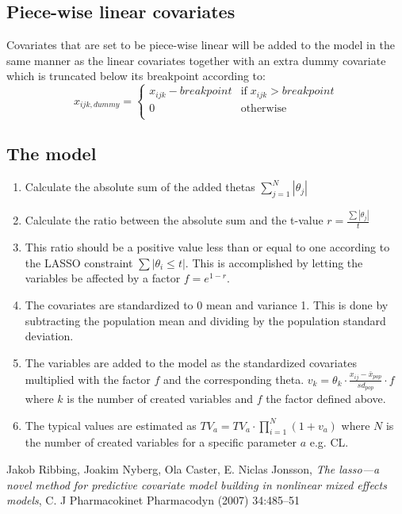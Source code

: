  
\subsection{Piece-wise linear covariates}
Covariates that are set to be piece-wise linear will be added to the model in the same manner as the linear covariates together with an extra dummy covariate which is truncated below its breakpoint according to:
\[   x_{ijk,dummy} = \left\{
        \begin{array}{ll}
            x_{ijk} - breakpoint & \textrm{if} \;  x_{ijk} > breakpoint \\
            0 & \textrm{otherwise} \\
        \end{array} 
    \right. \]

\subsection{The model}
\begin{enumerate}
    \item Calculate the absolute sum of the added thetas $\sum_{j=1}^N |\theta_j|$ 
    \item Calculate the ratio between the absolute sum and the t-value $r = \frac{\sum{|\theta_j|}}{t}$
    \item This ratio should be a positive value less than or equal to one according to the LASSO constraint $\sum{|\theta_i \le t|}$. This is accomplished by letting the variables be affected by a factor $f=e^{1-r}$.
    \item The covariates are standardized to 0 mean and variance 1. This is done by subtracting the population mean and dividing by the population standard deviation.
    \item The variables are added to the model as the standardized covariates multiplied with the factor $f$ and the corresponding theta. $v_k = \theta_k \cdot \frac{x_{ij} - \bar{x}_{pop}}{sd_{pop}} \cdot f$ where $k$ is the number of created variables and $f$ the factor defined above.
    \item The typical values are estimated as $TV_a = TV_a \cdot \prod_{i=1}^N ( 1+v_a)$ where $N$ is the number of created variables for a specific parameter $a$ e.g. CL.
\end{enumerate}



\begin{thebibliography}{1}
 Jakob Ribbing, Joakim Nyberg, Ola Caster, E. Niclas Jonsson, {\em The lasso—a novel method for predictive covariate model building in nonlinear mixed effects models}, C. J Pharmacokinet Pharmacodyn (2007) 34:485–51
\end{thebibliography}


